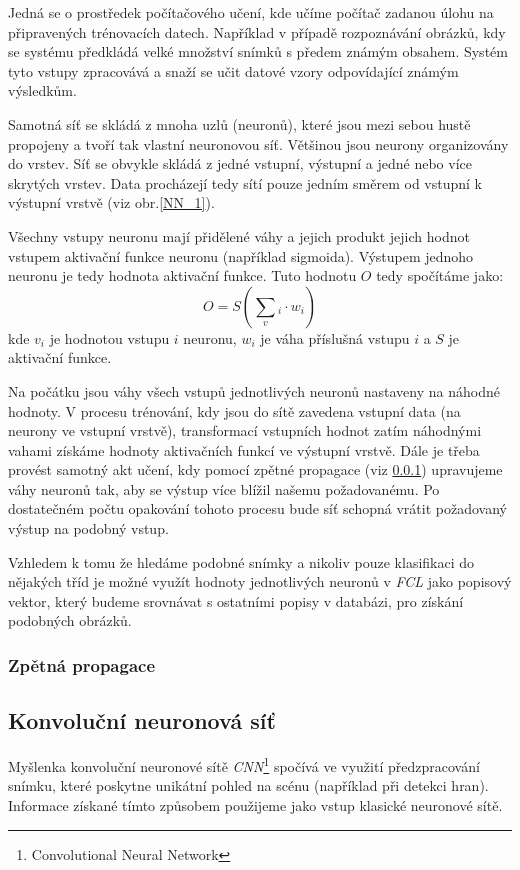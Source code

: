 \documentclass[12pt]{article}
\begin{document}
Jedná se o prostředek počítačového učení, kde učíme počítač zadanou úlohu na připravených trénovacích datech. Například v případě rozpoznávání obrázků, kdy se systému předkládá velké množství snímků s předem známým obsahem. Systém tyto vstupy zpracovává a snaží se učit datové vzory odpovídající známým výsledkům.

Samotná síť se skládá z mnoha uzlů (neuronů), které jsou mezi sebou hustě propojeny a tvoří tak vlastní neuronovou síť. Většinou jsou neurony organizovány do vrstev. Síť se obvykle skládá z jedné vstupní, výstupní a jedné nebo více skrytých vrstev. Data procházejí tedy sítí pouze jedním směrem od vstupní k výstupní vrstvě (viz obr.\ref{NN_1}).

Všechny vstupy neuronu mají přidělené váhy a jejich produkt jejich hodnot vstupem aktivační funkce neuronu (například sigmoida). Výstupem jednoho neuronu je tedy hodnota aktivační funkce. Tuto hodnotu $O$ tedy spočítáme jako:
\begin{equation}
\label{eq_activation}
O=S\left( \sum _{ v }^{  }{ {  }_{ i }\cdot { w }_{ i } }  \right)
\end{equation}
kde $v_i$ je hodnotou vstupu $i$ neuronu, $w_i$ je váha příslušná vstupu $i$ a $S$ je aktivační funkce.
 
Na počátku jsou váhy všech vstupů jednotlivých neuronů nastaveny na náhodné hodnoty. V procesu trénování, kdy jsou
do sítě zavedena vstupní data (na neurony ve vstupní vrstvě), transformací vstupních hodnot zatím náhodnými vahami získáme hodnoty aktivačních funkcí ve výstupní vrstvě. Dále je třeba provést samotný akt učení, kdy pomocí zpětné propagace (viz \ref{back_propagation}) upravujeme váhy neuronů tak, aby se výstup více blížil našemu požadovanému. Po dostatečném počtu opakování tohoto procesu bude síť schopná vrátit požadovaný výstup na podobný vstup. 

Vzhledem k tomu že hledáme podobné snímky a nikoliv pouze klasifikaci do nějakých tříd je možné využít hodnoty jednotlivých neuronů v \textit{FCL} jako popisový vektor, který budeme srovnávat s ostatními popisy v databázi, pro získání podobných obrázků.

\subsubsection{Zpětná propagace}
\label{back_propagation}

\subsection{Konvoluční neuronová síť}
Myšlenka konvoluční neuronové sítě \textit{CNN}\footnote{
Convolutional Neural Network} spočívá ve využití předzpracování snímku, které poskytne unikátní pohled na scénu (například při detekci hran). Informace získané tímto způsobem použijeme jako vstup klasické neuronové sítě.
\end{document}
